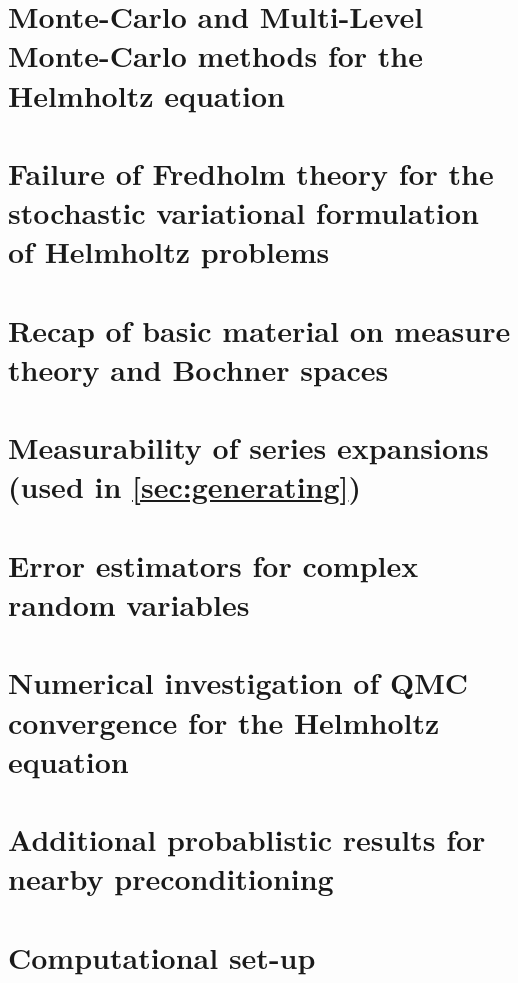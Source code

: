 \documentclass{report}
\begin{document}
\chapter{Monte-Carlo and Multi-Level Monte-Carlo methods for the Helmholtz equation}\label{chap:mlmc}





\appendix


\chapter{Failure of Fredholm theory for the stochastic variational formulation of Helmholtz problems}\label{sec:federico}
 	

\chapter{Recap of basic material on measure theory and Bochner spaces}\label{app:mtBs}


\chapter{Measurability of series expansions (used in \cref{sec:generating})}\label{app:meas}


\chapter{Error estimators for complex random variables}\label{app:complexerror}


\chapter{Numerical investigation of QMC convergence for the Helmholtz equation}\label{app:hhqmcconv}


\chapter{Additional probablistic results for nearby preconditioning}\label{app:probnbpc}


\chapter{Computational set-up}\label{app:compsetup}




\end{document}
